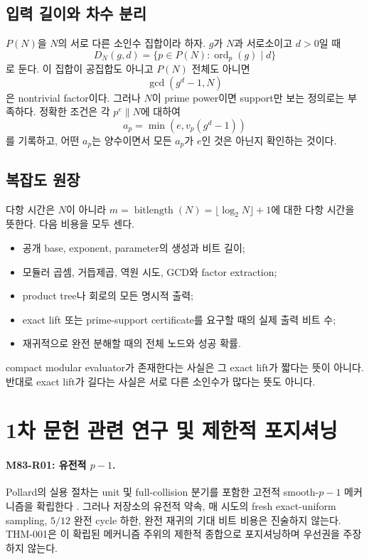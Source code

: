 \documentclass[11pt]{article}
\begin{document}
\subsection{입력 길이와 차수 분리}

\(P(N)\)을 \(N\)의 서로 다른 소인수 집합이라 하자. \(g\)가 \(N\)과
서로소이고 \(d>0\)일 때
\[
D_N(g,d)=\{p\in P(N):\operatorname{ord}_p(g)\mid d\}
\]
로 둔다. 이 집합이 공집합도 아니고 \(P(N)\) 전체도 아니면
\[
\gcd(g^d-1,N)
\]
은 nontrivial factor이다. 그러나 \(N\)이 prime power이면 support만
보는 정의로는 부족하다. 정확한 조건은 각 \(p^e\parallel N\)에
대하여
\[
a_p=\min(e,v_p(g^d-1))
\]
를 기록하고, 어떤 \(a_p\)는 양수이면서 모든 \(a_p\)가 \(e\)인 것은
아닌지 확인하는 것이다.

\subsection{복잡도 원장}

다항 시간은 \(N\)이 아니라
\(m=\operatorname{bitlength}(N)=\lfloor\log_2N\rfloor+1\)에 대한
다항 시간을 뜻한다. 다음 비용을 모두 센다.

\begin{itemize}
\item 공개 base, exponent, parameter의 생성과 비트 길이;
\item 모듈러 곱셈, 거듭제곱, 역원 시도, GCD와 factor extraction;
\item product tree나 회로의 모든 명시적 출력;
\item exact lift 또는 prime-support certificate를 요구할 때의 실제
  출력 비트 수;
\item 재귀적으로 완전 분해할 때의 전체 노드와 성공 확률.
\end{itemize}

compact modular evaluator가 존재한다는 사실은 그 exact lift가 짧다는
뜻이 아니다. 반대로 exact lift가 길다는 사실은 서로 다른 소인수가
많다는 뜻도 아니다.

\section{1차 문헌 관련 연구 및 제한적 포지셔닝}

\paragraph{M83-R01: 유전적 \(p-1\).}
Pollard의 실용 절차는 unit 및 full-collision 분기를 포함한 고전적
smooth-\(p-1\) 메커니즘을 확립한다 \cite{pollard1974theorems}.
그러나 저장소의 유전적 약속, 매 시도의 fresh exact-uniform sampling,
\(5/12\) 완전 cycle 하한, 완전 재귀의 기대 비트 비용은 진술하지
않는다. THM-001은 이 확립된 메커니즘 주위의 제한적 종합으로
포지셔닝하며 우선권을 주장하지 않는다.
\end{document}

